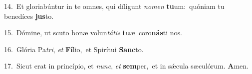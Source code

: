 {\numbfont\textcolor{\numbcolor}{14.}}~Et gloriabúntur in te omnes, qui díligunt \textit{no}\-\textit{men} \textbf{tu}\-um:~\star quóniam tu benedíces \textbf{jus}\-to.\par
{\numbfont\textcolor{\numbcolor}{15.}}~Dómine, ut scuto bonæ volun\-\textit{tá}\-\textit{tis} \textbf{tu}\-æ~\star coro\-\textbf{nás}\-ti nos.\par
{\numbfont\textcolor{\numbcolor}{16.}}~Glória Pa\-\textit{tri}\-, \textit{et} \textbf{Fí}\-lio,~\star et Spirítui \textbf{Sanc}\-to.\par
{\numbfont\textcolor{\numbcolor}{17.}}~Sicut erat in princípio, et \textit{nunc}\-, \textit{et} \textbf{sem}\-per,~\star et in sǽcula sæculórum. \textbf{A}\-men.\par
